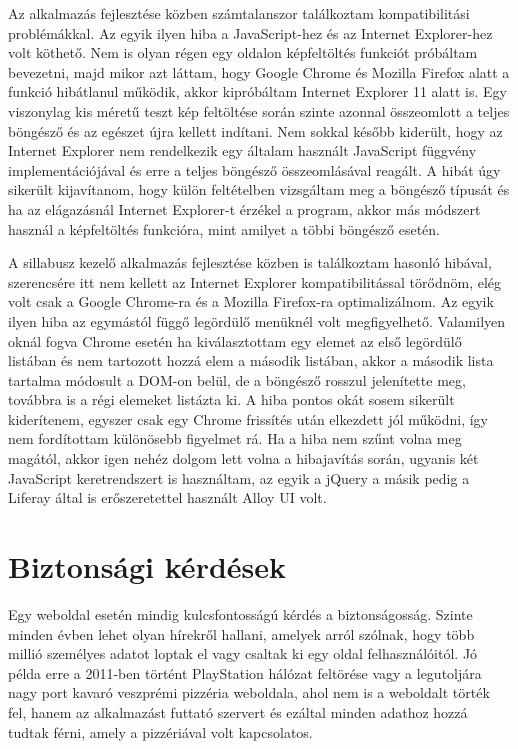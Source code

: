 \documentclass[hidelinks, 12pt, a4paper]{report}
\begin{document}
Az alkalmazás fejlesztése közben számtalanszor találkoztam kompatibilitási problémákkal. Az egyik ilyen hiba a JavaScript-hez és az Internet Explorer-hez volt köthető. Nem is olyan régen egy oldalon képfeltöltés funkciót próbáltam bevezetni, majd mikor azt láttam, hogy Google Chrome és Mozilla Firefox alatt a funkció hibátlanul működik, akkor kipróbáltam Internet Explorer 11 alatt is. Egy viszonylag kis méretű teszt kép feltöltése során szinte azonnal összeomlott a teljes böngésző és az egészet újra kellett indítani. Nem sokkal később kiderült, hogy az Internet Explorer nem rendelkezik egy általam használt JavaScript függvény implementációjával és erre a teljes böngésző összeomlásával reagált. A hibát úgy sikerült kijavítanom, hogy külön feltételben vizsgáltam meg a böngésző típusát és ha az elágazásnál Internet Explorer-t érzékel a program, akkor más módszert használ a képfeltöltés funkcióra, mint amilyet a többi böngésző esetén.

A sillabusz kezelő alkalmazás fejlesztése közben is találkoztam hasonló hibával, szerencsére itt nem kellett az Internet Explorer kompatibilitással törődnöm, elég volt csak a Google Chrome-ra és a Mozilla Firefox-ra optimalizálnom. Az egyik ilyen hiba az egymástól függő legördülő menüknél volt megfigyelhető. Valamilyen oknál fogva Chrome esetén ha kiválasztottam egy elemet az első legördülő listában és nem tartozott hozzá elem a második listában, akkor a második lista tartalma módosult a DOM-on belül, de a böngésző rosszul jelenítette meg, továbbra is a régi elemeket listázta ki. A hiba pontos okát sosem sikerült kiderítenem, egyszer csak egy Chrome frissítés után elkezdett jól működni, így nem fordítottam különösebb figyelmet rá. Ha a hiba nem szűnt volna meg magától, akkor igen nehéz dolgom lett volna a hibajavítás során, ugyanis két JavaScript keretrendszert is használtam, az egyik a jQuery \cite{jquery} a másik pedig a Liferay által is erőszeretettel használt Alloy UI \cite{alloyui} volt.

\section{Biztonsági kérdések}

Egy weboldal esetén mindig kulcsfontosságú kérdés a biztonságosság. Szinte minden évben lehet olyan hírekről hallani, amelyek arról szólnak, hogy több millió személyes adatot loptak el vagy csaltak ki egy oldal felhasználóitól. Jó példa erre a 2011-ben történt PlayStation hálózat feltörése vagy a legutoljára nagy port kavaró veszprémi pizzéria weboldala, ahol nem is a weboldalt törték fel, hanem az alkalmazást futtató szervert és ezáltal minden adathoz hozzá tudtak férni, amely a pizzériával volt kapcsolatos.
\end{document}
